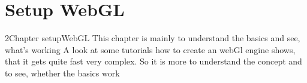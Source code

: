 \chapter{Setup WebGL}


2Chapter setupWebGL
This chapter is mainly to understand the basics and see, what’s working
A look at some tutorials how to create an webGl engine shows, that it gets quite fast very complex.
So it is more to understand the concept and to see, whether the basics work
